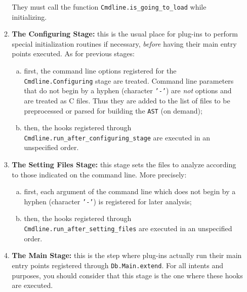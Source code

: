 \begin{enumerate}[A --]
\begin{enumerate}[1.]
  \begin{important}
    They must call the function
    \texttt{Cmdline.is\_going\_to\_load}
     while initializing.
  \end{important}

\item \textbf{The Configuring Stage:} this is the usual place for
  plug-ins to perform special initialization routines if necessary,
  \emph{before} having their main entry points executed. As for
  previous stages:

  \begin{enumerate}[(a)]
  \item first, the command line options registered for the
    \texttt{Cmdline.Configuring} stage
    are treated. Command line parameters that do not begin by a hyphen
    (character \texttt{'-'}) are \emph{not} options and are treated as
    \textsf{C} files. Thus they are added to the list of files to be
    preprocessed or parsed for building the \texttt{AST} (on demand);
  \item then, the hooks registered through
    \texttt{Cmdline.run\_after\_configuring\_stage}
     are executed
    in an unspecified order.
  \end{enumerate}

\item \textbf{The Setting Files Stage:} this stage sets the \C files to analyze
  according to those indicated on the command line. More precisely:

  \begin{enumerate}[(a)]
  \item first, each argument of the command line which does not begin by a
    hyphen (character \texttt{'-'}) is registered for later analysis;
  \item then, the hooks registered through
    \texttt{Cmdline.run\_after\_setting\_files}
     are executed in an
    unspecified order.
  \end{enumerate}

\item \textbf{The Main Stage:} this is the step where plug-ins actually run
  their main entry points registered through
  \texttt{Db.Main.extend}. For all intents and purposes, you should consider 
  that this stage is the one where these hooks are executed.

\end{enumerate}

\end{enumerate}

